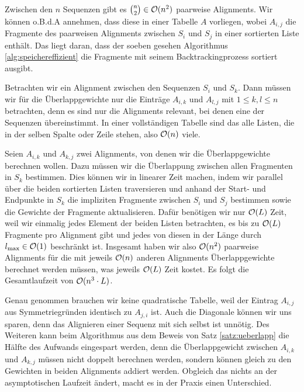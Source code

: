 
\begin{beweis}
	Zwischen den $n$ Sequenzen gibt es ${{n}\choose{2}} \in \mathcal{O}(n^2)$ paarweise Alignments. Wir können o.B.d.A annehmen, dass diese in einer Tabelle $A$ vorliegen, wobei $A_{i,j}$ die Fragmente des paarweisen Alignments zwischen $S_i$ und $S_j$ in einer sortierten Liste enthält. Das liegt daran, dass der soeben gesehen Algorithmus \ref{alg:speichereffizient} die Fragmente mit seinem Backtrackingprozess sortiert ausgibt. 
	
	Betrachten wir ein Alignment zwischen den Sequenzen $S_i$ und $S_k$. Dann müssen wir für die Überlappgewichte nur die Einträge $A_{i,k}$ und $A_{l,j}$ mit $1 \leq k,l \leq n$ betrachten, denn es sind nur die Alignments relevant, bei denen eine der Sequenzen übereinstimmt. In einer vollständigen Tabelle sind das alle Listen, die in der selben Spalte oder Zeile stehen, also $\mathcal{O}(n)$ viele.
	
	Seien $A_{i,k}$ und $A_{k,j}$ zwei Alignments, von denen wir die Überlappgewichte berechnen wollen. Dazu müssen wir die Überlappung zwischen allen Fragmenten in $S_k$ bestimmen. Dies können wir in linearer Zeit machen, indem wir parallel über die beiden sortierten Listen traversieren und anhand der Start- und Endpunkte in $S_k$ die impliziten Fragmente zwischen $S_i$ und $S_j$ bestimmen sowie die Gewichte der Fragmente aktualisieren. Dafür benötigen wir nur $\mathcal{O}(L)$ Zeit, weil wir einmalig jedes Element der beiden Listen betrachten, es bis zu $\mathcal{O}(L)$ Fragmente pro Alignment gibt und jedes von diesen in der Länge durch $l_{\max} \in \mathcal{O}(1)$ beschränkt ist.
	Insgesamt haben wir also $\mathcal{O}(n^2)$ paarweise Alignments für die mit jeweils $\mathcal{O}(n)$ anderen Alignments Überlappgewichte berechnet werden müssen, was jeweils $\mathcal{O}(L)$ Zeit kostet. Es folgt die Gesamtlaufzeit von $\mathcal{O}(n^3\cdot L)$.
\end{beweis}

Genau genommen brauchen wir keine quadratische Tabelle, weil der Eintrag $A_{i,j}$ aus Symmetriegründen identisch zu $A_{j,i}$ ist. Auch die Diagonale können wir uns sparen, denn das Alignieren einer Sequenz mit sich selbst ist unnötig. Des Weiteren kann beim Algorithmus aus dem Beweis von Satz \ref{satz:ueberlapp} die Hälfte des Aufwands eingespart werden, denn die Überlappgewicht zwischen $A_{i,k}$ und $A_{k,j}$ müssen nicht doppelt berechnen werden, sondern können gleich zu den Gewichten in beiden Alignments addiert werden. Obgleich das nichts an der asymptotischen Laufzeit ändert, macht es in der Praxis einen Unterschied. 

